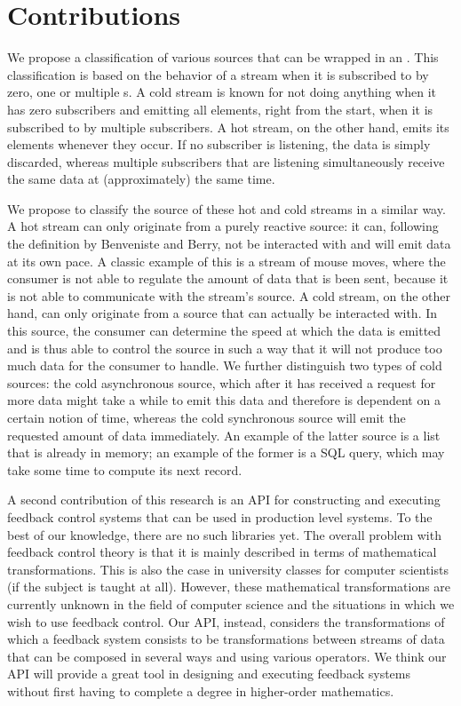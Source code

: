 \section{Contributions}
We propose a classification of various sources that can be wrapped in an \obs. This classification is based on the behavior of a stream when it is subscribed to by zero, one or multiple s. A cold stream is known for not doing anything when it has zero subscribers and emitting all elements, right from the start, when it is subscribed to by multiple subscribers. A hot stream, on the other hand, emits its elements whenever they occur. If no subscriber is listening, the data is simply discarded, whereas multiple subscribers that are listening simultaneously receive the same data at (approximately) the same time.

We propose to classify the source of these hot and cold streams in a similar way. A hot stream can only originate from a purely reactive source: it can, following the definition by Benveniste and Berry, not be interacted with and will emit data at its own pace. A classic example of this is a stream of mouse moves, where the consumer is not able to regulate the amount of data that is been sent, because it is not able to communicate with the stream's source. A cold stream, on the other hand, can only originate from a source that can actually be interacted with. In this source, the consumer can determine the speed at which the data is emitted and is thus able to control the source in such a way that it will not produce too much data for the consumer to handle. We further distinguish two types of cold sources: the cold asynchronous source, which after it has received a request for more data might take a while to emit this data and therefore is dependent on a certain notion of time, whereas the cold synchronous source will emit the requested amount of data immediately. An example of the latter source is a list that is already in memory; an example of the former is a SQL query, which may take some time to compute its next record.

A second contribution of this research is an API for constructing and executing feedback control systems that can be used in production level systems. To the best of our knowledge, there are no such libraries yet. The overall problem with feedback control theory is that it is mainly described in terms of mathematical transformations. This is also the case in university classes for computer scientists (if the subject is taught at all). However, these mathematical transformations are currently unknown in the field of computer science and the situations in which we wish to use feedback control. Our API, instead, considers the transformations of which a feedback system consists to be transformations between streams of data that can be composed in several ways and using various operators. We think our API will provide a great tool in designing and executing feedback systems without first having to complete a degree in higher-order mathematics.

